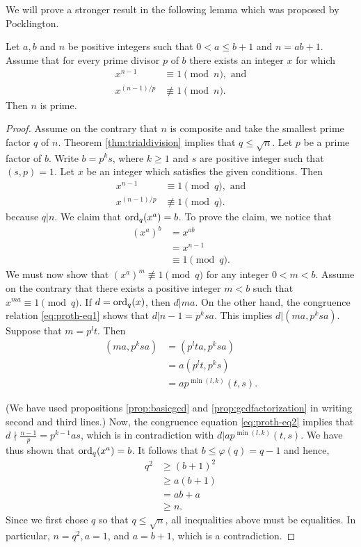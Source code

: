 \documentclass{subfiles}
\begin{document}
	We will prove a stronger result in the following lemma which was proposed by Pocklington.
	
	\begin{lemma}
		Let $a, b$ and $n$  be positive integers such that $0<a \leq b+1$ and $n=ab+1$. Assume that for every prime divisor $p$ of $b$ there exists an integer $x$ for which
		\begin{align*}
			x^{n-1} &\equiv 1 \pmod n, \text{ and}\\
			x^{(n-1)/p} &\not \equiv 1 \pmod n.
		\end{align*}
		Then $n$ is prime.
	\end{lemma}
	
	\begin{proof}
		Assume on the contrary that $n$ is composite and take the smallest prime factor $q$ of $n$. Theorem \eqref{thm:trialdivision} implies that $q \leq \sqrt n$. Let $p$ be a prime factor of $b$. Write $b=p^ks$, where $k\geq 1$ and $s$ are positive integer such that $(s,p)=1$. Let $x$ be an integer which satisfies the given conditions. Then
		\begin{align}
			x^{n-1} &\equiv 1 \pmod q, \text{ and} \label{eq:proth-eq1}\\
			x^{(n-1)/p} &\not \equiv 1 \pmod q.\label{eq:proth-eq2}
		\end{align}
		because $q|n$. We claim that $\operatorname{ord}_q(x^a)=b$. To prove the claim, we notice that
		\begin{align*}
			\left(x^{a}\right)^b &= x^{ab}\\
			&= x^{n-1}\\
			&\equiv 1 \pmod q. 
		\end{align*}
		We must now show that $\left(x^{a}\right)^m \not \equiv 1 \pmod q$ for any integer $0<m<b$. Assume on the contrary that there exists a positive integer $m<b$ such that $x^{ma} \equiv 1 \pmod q$. If $d=\operatorname{ord}_q(x)$, then $d|ma$. On the other hand, the congruence relation \eqref{eq:proth-eq1} shows that $d|n-1=p^ksa$. This implies $d|(ma, p^ksa)$. Suppose that $m=p^lt$. Then
		\begin{align*}
			\left(ma, p^ksa\right) &= \left(p^lta, p^ksa\right)\\
			&= a \left(p^lt, p^ks\right)\\
			&= a p^{\min(l,k)} (t,s).
		\end{align*}
		
		(We have used propositions \eqref{prop:basicgcd} and \eqref{prop:gcdfactorization} in writing second and third lines.) Now, the congruence equation \eqref{eq:proth-eq2} implies that $d \nmid \frac{n-1}{p}=p^{k-1}as$, which is in contradiction with $d|a p^{\min(l,k)} (t,s)$. We have thus shown that $\operatorname{ord}_q(x^a)=b$. It follows that $b \leq \varphi(q) = q-1$ and hence,
		\begin{align*}
			q^2 &\geq (b+1)^2\\
			&\geq a(b+1)\\
			&=ab+a\\
			&\geq n.
		\end{align*}
		Since we first chose $q$ so that $q \leq \sqrt n$, all inequalities above must be equalities. In particular, $n=q^2, a=1$, and $a=b+1$, which is a contradiction.
	\end{proof}
	
\end{document}
